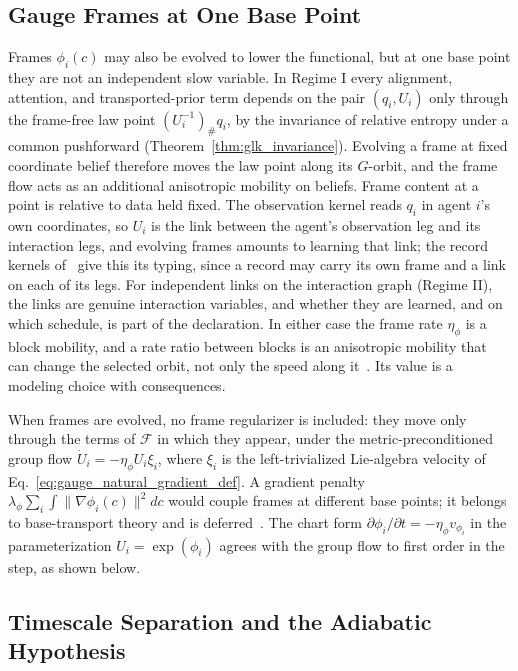 \subsection{Gauge Frames at One Base Point}
\label{sec:frame_evolution}

Frames $\phi_i(c)$ may also be evolved to lower the functional, but at one base point they are not an independent slow variable. In Regime I every alignment, attention, and transported-prior term depends on the pair $(q_i, U_i)$ only through the frame-free law point $(U_i^{-1})_\# q_i$, by the invariance of relative entropy under a common pushforward (Theorem~\ref{thm:glk_invariance}). Evolving a frame at fixed coordinate belief therefore moves the law point along its $G$-orbit, and the frame flow acts as an additional anisotropic mobility on beliefs. Frame content at a point is relative to data held fixed. The observation kernel reads $q_i$ in agent $i$'s own coordinates, so $U_i$ is the link between the agent's observation leg and its interaction legs, and evolving frames amounts to learning that link; the record kernels of~\cite[Ch.~5]{DennisGaugeVFE2026} give this its typing, since a record may carry its own frame and a link on each of its legs. For independent links on the interaction graph (Regime II), the links are genuine interaction variables, and whether they are learned, and on which schedule, is part of the declaration. In either case the frame rate $\eta_\phi$ is a block mobility, and a rate ratio between blocks is an anisotropic mobility that can change the selected orbit, not only the speed along it~\cite[Chs.~7 and~8]{DennisGaugeVFE2026}. Its value is a modeling choice with consequences.

When frames are evolved, no frame regularizer is included: they move only through the terms of $\mathcal{F}$ in which they appear, under the metric-preconditioned group flow $\dot U_i = -\eta_\phi U_i \xi_i$, where $\xi_i$ is the left-trivialized Lie-algebra velocity of Eq.~\eqref{eq:gauge_natural_gradient_def}. A gradient penalty $\lambda_\phi \sum_i \int \|\nabla \phi_i(c)\|^2  dc$ would couple frames at different base points; it belongs to base-transport theory and is deferred~\cite{DennisGaugeVFESuppB2026}. The chart form $\partial\phi_i/\partial t = -\eta_\phi v_{\phi_i}$ in the parameterization $U_i = \exp(\phi_i)$ agrees with the group flow to first order in the step, as shown below.

\subsection{Timescale Separation and the Adiabatic Hypothesis}
\label{sec:adiabatic_hierarchy}

